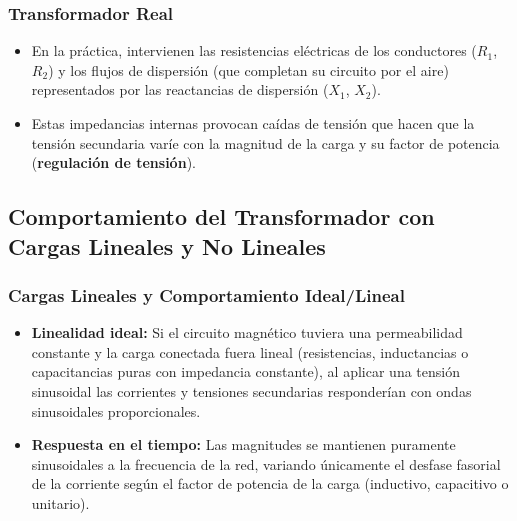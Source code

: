 \documentclass[12pt]{article}
\begin{document}
\subsubsection*{Transformador Real}
\begin{itemize}
    \item En la pr\'actica, intervienen las resistencias el\'ectricas de los conductores ($R_1$, $R_2$) y los flujos de dispersi\'on (que completan su circuito por el aire) representados por las reactancias de dispersi\'on ($X_1$, $X_2$).

    \item Estas impedancias internas provocan ca\'idas de tensi\'on que hacen que la tensi\'on secundaria var\'ie con la magnitud de la carga y su factor de potencia (\textbf{regulaci\'on de tensi\'on}).
\end{itemize}

\subsection{Comportamiento del Transformador con Cargas Lineales y No Lineales}

\subsubsection*{Cargas Lineales y Comportamiento Ideal/Lineal}
\begin{itemize}
    \item \textbf{Linealidad ideal:} Si el circuito magn\'etico tuviera una permeabilidad constante y la carga conectada fuera lineal (resistencias, inductancias o capacitancias puras con impedancia constante), al aplicar una tensi\'on sinusoidal las corrientes y tensiones secundarias responder\'ian con ondas sinusoidales proporcionales.

    \item \textbf{Respuesta en el tiempo:} Las magnitudes se mantienen puramente sinusoidales a la frecuencia de la red, variando \'unicamente el desfase fasorial de la corriente seg\'un el factor de potencia de la carga (inductivo, capacitivo o unitario).
\end{itemize}
\end{document}
